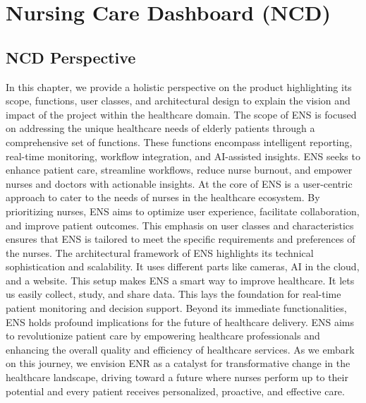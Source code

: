 
\chapter{Nursing Care Dashboard (NCD)} %
\label{Chapter6}
\section{NCD Perspective}
In this chapter, we provide a holistic perspective on the product highlighting its scope, functions, user classes, and architectural design to explain the vision and impact of the project within the healthcare domain.
The scope of ENS is focused on addressing the unique healthcare needs of elderly patients through a comprehensive set of functions. These functions encompass intelligent reporting, real-time monitoring, workflow integration, and AI-assisted insights. ENS seeks to enhance patient care, streamline workflows, reduce nurse burnout, and empower nurses and doctors with actionable insights. 
At the core of ENS is a user-centric approach to cater to the needs of nurses in the healthcare ecosystem. By prioritizing nurses, ENS aims to optimize user experience, facilitate collaboration, and improve patient outcomes. This emphasis on user classes and characteristics ensures that ENS is tailored to meet the specific requirements and preferences of the nurses.
The architectural framework of ENS highlights its technical sophistication and scalability. It uses different parts like cameras, AI in the cloud, and a website. This setup makes ENS a smart way to improve healthcare. It lets us easily collect, study, and share data. This lays the foundation for real-time patient monitoring and decision support. 
Beyond its immediate functionalities, ENS holds profound implications for the future of healthcare delivery.  ENS aims to revolutionize patient care by empowering healthcare professionals and enhancing the overall quality and efficiency of healthcare services. As we embark on this journey, we envision ENR as a catalyst for transformative change in the healthcare landscape, driving toward a future where nurses perform up to their potential and every patient receives personalized, proactive, and effective care.
 
